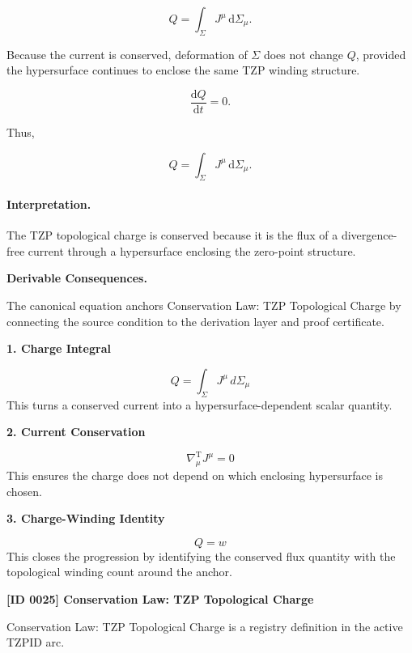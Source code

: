 \begin{equation}
Q
=
\int_{\Sigma}
J^\mu
\,\mathrm{d}\Sigma_\mu .
\end{equation}

Because the current is conserved, deformation of $\Sigma$ does not change $Q$, provided the hypersurface continues to enclose the same TZP winding structure.

\begin{equation}
\frac{\mathrm{d}Q}{\mathrm{d}t}=0 .
\end{equation}

Thus,

\begin{equation}
\boxed{
Q
=
\int_{\Sigma}
J^\mu
\,\mathrm{d}\Sigma_\mu .
}
\end{equation}

\paragraph{Interpretation.}
The TZP topological charge is conserved because it is the flux of a divergence-free current through a hypersurface enclosing the zero-point structure.

\par\vspace{0.35em}
\noindent\textbf{Derivable Consequences.}\quad
\begingroup
\footnotesize
\raggedright
The canonical equation anchors Conservation Law: TZP Topological Charge by connecting the source condition to the derivation layer and proof certificate.
\par\endgroup

\noindent\textbf{1. Charge Integral}\par
\[
Q
=
\int_{\Sigma} J^{\mu}\, d\Sigma_{\mu}
\]
\noindent This turns a conserved current into a hypersurface-dependent scalar quantity.\par
\noindent\textbf{2. Current Conservation}\par
\[
\nabla^{\mathrm{T}}_{\mu}J^{\mu}=0
\]
\noindent This ensures the charge does not depend on which enclosing hypersurface is chosen.\par
\noindent\textbf{3. Charge-Winding Identity}\par
\[
Q=w
\]
\noindent This closes the progression by identifying the conserved flux quantity with the topological winding count around the anchor.\par

\clearpage
\noindent\textbf{[ID 0025] Conservation Law: TZP Topological Charge}\par
\vspace{0.35em}
\begingroup\small
{}
Conservation Law: TZP Topological Charge is a registry definition in the active TZPID arc.

